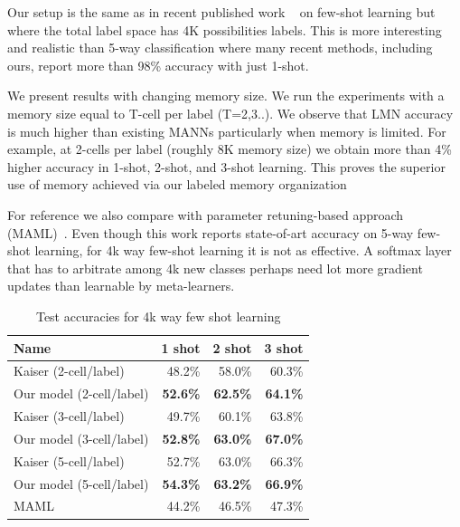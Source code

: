 \documentclass[letterpaper]{article} %
\begin{document}
Our setup is the same as in recent published work ~  on few-shot learning but where the total label space has 4K possibilities labels.  This is more interesting and realistic than 5-way classification where many recent methods, including ours, report more than 98\% accuracy with just 1-shot.

We present results with changing memory size. We run the experiments with a memory size equal to T-cell per label (T=2,3..).  We observe that LMN accuracy is much higher than existing MANNs particularly when memory is limited. For example, at 2-cells per label (roughly 8K memory size) we obtain more than 4\% higher accuracy in 1-shot, 2-shot, and 3-shot learning. This proves the superior use of memory achieved via our labeled memory organization

For reference we also compare with parameter retuning-based approach (MAML)~.  Even though this work reports state-of-art accuracy on 5-way few-shot learning, for 4k way few-shot learning it is not as effective.  A softmax layer that has to arbitrate among 4k new classes perhaps need lot more gradient updates than learnable by meta-learners.


\begin{table}[!htb]
\begin{center}
\begin{tabular}{|l|r|r|r|} \hline
Name &   1 shot &   2 shot &  3 shot \\ \hline
Kaiser (2-cell/label) & 48.2\%	&	58.0\%	&	60.3\% \\
Our model (2-cell/label) & \textbf{52.6\%}	&	\textbf{62.5\%}	&	\textbf{64.1\%} \\ \hline
Kaiser (3-cell/label) & 49.7\%	&	60.1\%	&	63.8\% \\
Our model (3-cell/label) & \textbf{52.8\%}	&	\textbf{63.0\%}	&	\textbf{67.0\%} \\ \hline
Kaiser (5-cell/label) & 52.7\%	&	63.0\%	&	66.3\% \\
Our model (5-cell/label) & \textbf{54.3\%}	&	\textbf{63.2\%}	&	\textbf{66.9\%} \\ \hline
MAML & 44.2\% & 46.5\% & 47.3\%  \\ \hline
\end{tabular}
\end{center}
\caption{\label{fewshot-results1} Test accuracies for 4k way few shot learning}

\end{table}
\end{document}
